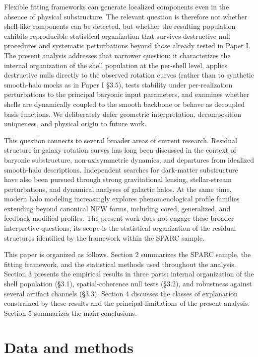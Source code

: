 \documentclass[linenumbers,trackchanges]{aastex701}
\begin{document}
Flexible fitting frameworks can generate localized components even in the absence of physical substructure. The relevant question is therefore not whether shell-like components can be detected, but whether the resulting population exhibits reproducible statistical organization that survives destructive null procedures and systematic perturbations beyond those already tested in Paper I. The present analysis addresses that narrower question: it characterizes the internal organization of the shell population at the per-shell level, applies destructive nulls directly to the observed rotation curves (rather than to synthetic smooth-halo mocks as in Paper I \S3.5), tests stability under per-realization perturbations to the principal baryonic input parameters, and examines whether shells are dynamically coupled to the smooth backbone or behave as decoupled basis functions. We deliberately defer geometric interpretation, decomposition uniqueness, and physical origin to future work.

This question connects to several broader areas of current research. Residual structure in galaxy rotation curves has long been discussed in the context of baryonic substructure, non-axisymmetric dynamics, and departures from idealized smooth-halo descriptions. Independent searches for dark-matter substructure have also been pursued through strong gravitational lensing, stellar-stream perturbations, and dynamical analyses of galactic halos. At the same time, modern halo modeling increasingly explores phenomenological profile families extending beyond canonical NFW forms, including cored, generalized, and feedback-modified profiles. The present work does not engage these broader interpretive questions; its scope is the statistical organization of the residual structures identified by the framework within the SPARC sample.

This paper is organized as follows. Section 2 summarizes the SPARC sample, the fitting framework, and the statistical methods used throughout the analysis. Section 3 presents the empirical results in three parts: internal organization of the shell population (\S3.1), spatial-coherence null tests (\S3.2), and robustness against several artifact channels (\S3.3). Section 4 discusses the classes of explanation constrained by these results and the principal limitations of the present analysis. Section 5 summarizes the main conclusions.

\section{Data and methods}
\end{document}
